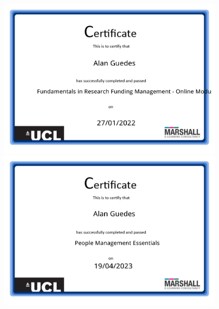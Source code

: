 \documentclass[10pt,a4paper,sans,colorlinks]{moderncv}
\begin{document}
\begin{figure}
    \includegraphics[align=t,width=\textwidth,height=0.22\textheight, keepaspectratio=true]{certificates/Fundamentals_in_Research_Funding.pdf}
    \centering \includegraphics[align=t,width=\textwidth,height=0.22\textheight, keepaspectratio=true]{certificates/People_Management_Essentials.pdf}
\end{figure}
\end{document}
